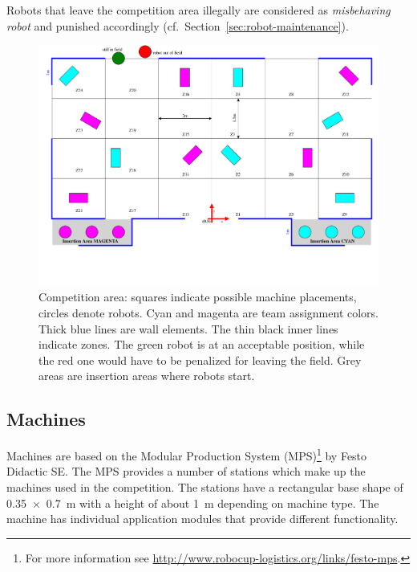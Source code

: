 \documentclass[12pt,twoside]{article}
\newcommand{\refsec}[1]{Section~\ref{#1}}
\begin{document}
Robots that leave the competition area illegally are considered as
\emph{misbehaving robot} and punished accordingly
(cf.~\refsec{sec:robot-maintenance}).

\begin{figure}
  \includegraphics[angle=-90 , trim = 30 80 20 0,
  scale=0.8]{field.pdf}
  \vspace{1ex}
  \caption{Competition area: squares indicate possible machine
    placements, circles denote robots. Cyan and magenta are team
    assignment colors. Thick blue lines are wall elements. The thin
    black inner lines indicate zones. The green robot is at an
    acceptable position, while the red one would have to be penalized
    for leaving the field. Grey areas are insertion areas where robots
    start.}
  \label{fig:competition-area}
\end{figure}

\subsection{Machines}
\label{sec:machines}
Machines are based on the Modular Production System (MPS)\footnote{For
  more information see
  \url{http://www.robocup-logistics.org/links/festo-mps}.} by Festo
Didactic SE. The MPS provides a number of stations which
make up the machines used in the competition. The stations have a
rectangular base shape of \SI{0,35 x 0,7}{\metre} with a height of
about \SI{1}{\metre} depending on machine type. The machine
has individual application modules that provide different
functionality.
\end{document}
